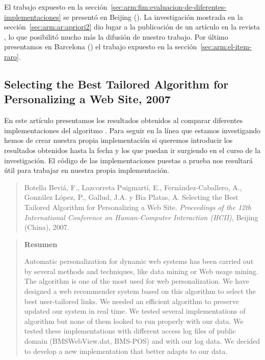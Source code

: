El trabajo expuesto en la sección~\ref{sec:arm:fim:evaluacion-de-diferentes-implementaciones} se presentó en Beijing (). La investigación mostrada en la sección~\ref{sec:arm:ar:apriori2} dio lugar a la publicación de un artículo en la revista , lo que posibilitó mucho más la difusión de nuestro trabajo. Por último presentamos en Barcelona () el trabajo expuesto en la sección~\ref{sec:arm:el-item-raro}.





\subsection*{Selecting the Best Tailored Algorithm for Personalizing a Web Site, 2007}
\label{sec:nuestro-Selecting-2007}
En este artículo presentamos los resultados obtenidos al comparar diferentes implementaciones del algoritmo \apriori. Para seguir en la línea que estamos investigando hemos de crear nuestra propia implementación si queremos introducir los resultados obtenidos hasta la fecha y los que puedan ir surgiendo en el curso de la investigación. El código de las implementaciones puestas a prueba nos resultará útil para trabajar en nuestra propia implementación.

\begin{quote}
  Botella Beviá, F., Lazcorreta Puigmartí, E., Fernández-Caballero, A., González López, P., Gallud,
J.A. y Bia Platas, A. Selecting the Best Tailored Algorithm for Personalizing a Web Site. \emph{Proceedings of the 12th International Conference on Human-Computer Interaction ({HCII})}, Beijing (China), 2007. 
\end{quote}

\begin{quotation}
	\noindent\textbf{Resumen}

	\nopagebreak Automatic personalization for dynamic web systems has been carried out by several methods and techniques, like data mining or Web usage mining. The \apriori algorithm is one of the most used for web personalization. We have designed a web recommender system based on this algorithm to select the best user-tailored links. We needed an efficient algorithm to preserve updated our system in real time. We tested several implementations of \apriori algorithm but none of them looked to run properly with our data. We tested these implementations with different access log files of public domain (BMSWebView.dat, BMS-POS) and with our log data. We decided to develop a new implementation that better adapts to our data.
\end{quotation}








